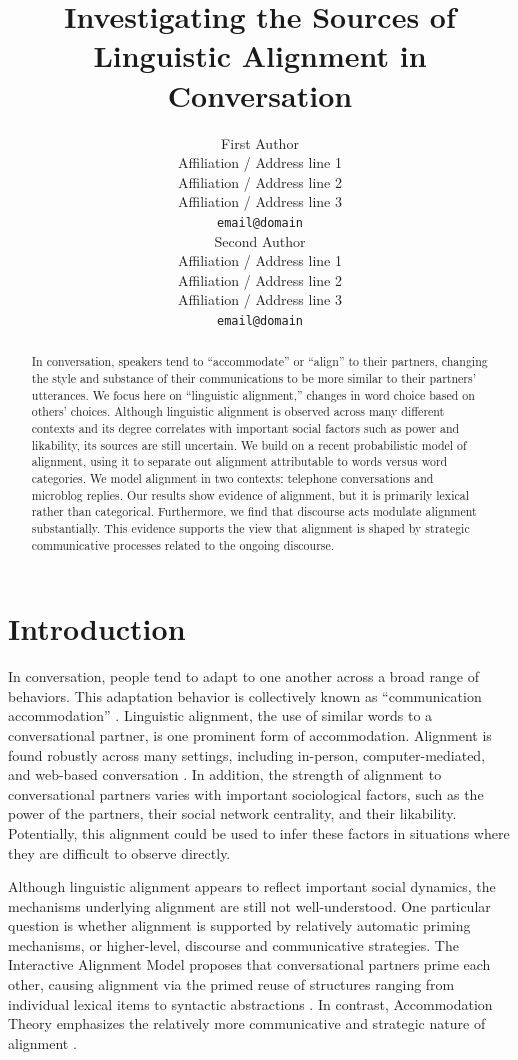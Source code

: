 \documentclass[11pt]{article}
\title{Investigating the Sources of Linguistic Alignment in Conversation}
\author{First Author \\
  Affiliation / Address line 1 \\
  Affiliation / Address line 2 \\
  Affiliation / Address line 3 \\
  {\tt email@domain} \\\And
  Second Author \\
  Affiliation / Address line 1 \\
  Affiliation / Address line 2 \\
  Affiliation / Address line 3 \\
  {\tt email@domain} \\}
\date{}
\begin{document}
\maketitle

\begin{abstract}
In conversation, speakers tend to ``accommodate'' or ``align'' to their partners, changing the style and substance of their communications to be more similar to their partners' utterances. We focus here on ``linguistic alignment,'' changes in word choice based on others' choices. Although linguistic alignment is observed across many different contexts and its degree correlates with important social factors such as power and likability, its sources are still uncertain.
We build on a recent probabilistic model of alignment, using it to separate out alignment attributable to words versus word categories. We model alignment in two contexts: telephone conversations and microblog replies.
Our results show evidence of alignment, but it is primarily lexical rather than categorical. Furthermore, we find that discourse acts modulate alignment substantially. This evidence supports the view that alignment is shaped by strategic communicative processes related to the ongoing discourse.
\end{abstract}

\section{Introduction}

In conversation, people tend to adapt to one another across a broad range of behaviors. This adaptation behavior is collectively known as ``communication accommodation'' \cite{GilesCouplandCoupland1991}. Linguistic alignment, the use of similar words to a conversational partner, is one prominent form of accommodation. Alignment is found robustly across many settings, including in-person, computer-mediated, and web-based conversation \cite{DNMEtAl2012,GilesSchererTaylor1979,NiederhofferPennebaker2002}. In addition, the strength of alignment to conversational partners varies with important sociological factors, such as the power of the partners, their social network centrality, and their likability. Potentially, this alignment could be used to infer these factors in situations where they are difficult to observe directly.

Although linguistic alignment appears to reflect important social dynamics, the mechanisms underlying alignment are still not well-understood. One particular question is whether alignment is supported by relatively automatic priming mechanisms, or higher-level, discourse and communicative strategies. The Interactive Alignment Model proposes that conversational partners prime each other, causing alignment via the primed reuse of structures ranging from individual lexical items to syntactic abstractions  \cite{PickeringGarrod2004}. In contrast, Accommodation Theory emphasizes the relatively more communicative and strategic nature of alignment \cite{GilesCouplandCoupland1991}.
\end{document}
